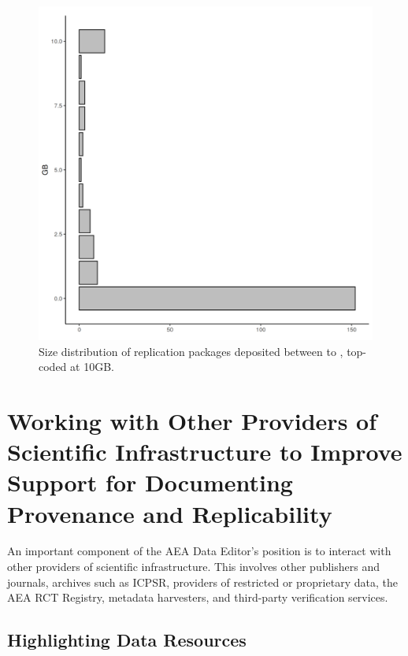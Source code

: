 \documentclass[PP]{AEA}
\begin{document}

\begin{figure}[t]
    \centering
    \includegraphics[width=\textwidth]{images/plot_filesize_dist.png} 
    \caption{Size distribution of replication packages deposited between  \firstday{} to \lastday{}, top-coded at 10GB.}
    \label{fig:size_packages}
\end{figure}



\section{Working with Other Providers of Scientific Infrastructure to Improve Support for Documenting Provenance and Replicability}
\label{sec:coordination}

An important component of the AEA Data Editor's position is to interact with other providers of scientific infrastructure. This involves other publishers and journals, archives such as ICPSR, providers of restricted or proprietary data, the AEA RCT Registry, metadata harvesters, and third-party verification services. 

\subsection{Highlighting Data Resources}
\end{document}
